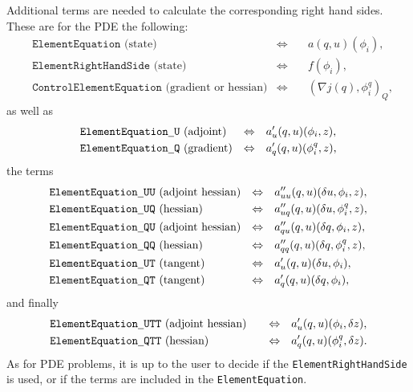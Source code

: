 Additional terms are needed to calculate the corresponding 
right hand sides. These are for the PDE the following: 
{
\begin{align*}
&\texttt{ElementEquation}\text{ (state)} &\Leftrightarrow &\quad a(q,u)(\phi_i), \\
&\texttt{ElementRightHandSide}\text{ (state)}  &\Leftrightarrow &\quad f(\phi_i), \\
&\texttt{ControlElementEquation}\text{ (gradient or hessian)}  &\Leftrightarrow &\quad (\nabla j(q),\phi^q_i)_Q,
\end{align*}
as well as 
\begin{align*}
&\texttt{ElementEquation\underline{ }U}\text{ (adjoint)} 
&\Leftrightarrow &\quad a_u'(q,u)(\phi_i, z),\\
&\texttt{ElementEquation\underline{ }Q}\text{ (gradient)} 
&\Leftrightarrow &\quad a_q'(q,u)(\phi^q_i,z), \\
\end{align*}
the terms
\begin{align*}
&\texttt{ElementEquation\underline{ }UU}\text{ (adjoint hessian)}  
&\Leftrightarrow &\quad a_{uu}''(q,u)(\delta u, \phi_i, z),\\
&\texttt{ElementEquation\underline{ }UQ}\text{ (hessian)}
&\Leftrightarrow &\quad a_{uq}''(q,u)(\delta u, \phi^q_i, z),\\
&\texttt{ElementEquation\underline{ }QU}\text{ (adjoint hessian)} 
&\Leftrightarrow &\quad a_{qu}''(q,u)(\delta q, \phi_i, z), \\
&\texttt{ElementEquation\underline{ }QQ}\text{ (hessian)} 
&\Leftrightarrow &\quad a_{qq}''(q,u)(\delta q, \phi^q_i, z),\\
&\texttt{ElementEquation\underline{ }UT}\text{ (tangent)}  
&\Leftrightarrow &\quad a_u'(q,u)(\delta u, \phi_i), \\
&\texttt{ElementEquation\underline{ }QT}\text{ (tangent)}  
&\Leftrightarrow &\quad a_q'(q,u)(\delta q, \phi_i),
\end{align*}
and finally
\begin{align*}
&\texttt{ElementEquation\underline{ }UTT}\text{ (adjoint hessian)} \quad 
&\Leftrightarrow &\quad  a_u'(q,u)(\phi_i, \delta z), \\
&\texttt{ElementEquation\underline{ }QTT}\text{ (hessian)} \quad 
&\Leftrightarrow &\quad a_{q}'(q,u)(\phi^q_i,\delta z).
\end{align*}}
As for PDE problems, it is up to the user to decide if the \texttt{ElementRightHandSide}
is used, or if the terms are included in the \texttt{ElementEquation}. 


